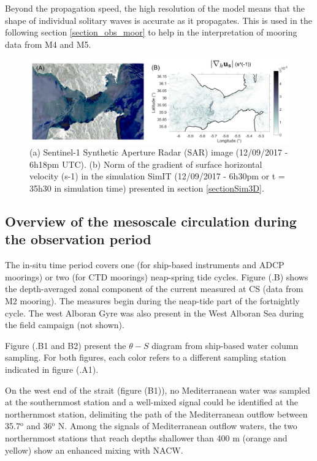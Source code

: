 Beyond the propagation speed, the high resolution of the model means that the shape of individual solitary waves is accurate as it propagates. This is used in the following section \ref{section_obs_moor} to help in the interpretation of mooring data from M4 and M5.


\begin{figure}[!h]
 \includegraphics[width=\textwidth]{./GBR3D/Comp_SAR_IES.png}
 \caption {(a) Sentinel-1 Synthetic Aperture Radar (SAR) image (12/09/2017 - 6h18pm UTC). (b) Norm of the gradient of surface horizontal velocity (s-1) in the simulation SimIT (12/09/2017 - 6h30pm or t = 35h30 in simulation time) presented in section \ref{sectionSim3D}.}
 \label{fig_SARIES}
\end{figure}


\subsection{Overview of the mesoscale circulation during the observation period}

The in-situ time period covers one (for ship-based instruments and ADCP moorings) or two (for CTD moorings) neap-spring tide cycles. Figure (.B) shows the depth-averaged zonal component of the current measured at CS (data from M2 mooring). The measures begin during the neap-tide part of the fortnightly cycle. The west Alboran Gyre was also present in the West Alboran Sea during the field campaign (not shown). 

Figure (.B1 and B2) present the $\theta-S$ diagram from ship-based water column sampling. For both figures, each color refers to a different sampling station indicated in figure (.A1).

On the west end of the strait (figure (B1)), no Mediterranean water was sampled at the southernmost station and a well-mixed signal could be identified at the northernmost station, delimiting the path of the Mediterranean outflow between 35.7$^{\text{o}}$ and 36$^{\text{o}}$ N. Among the signals of Mediterranean outflow waters, the two northernmost stations that reach depths shallower than 400 m (orange and yellow) show an enhanced mixing with NACW.

